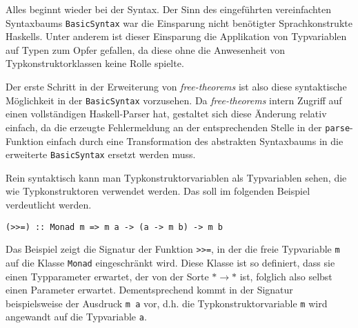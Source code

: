 Alles beginnt wieder bei der Syntax. Der Sinn des eingeführten vereinfachten Syntaxbaums \texttt{BasicSyntax} war
die Einsparung nicht benötigter Sprachkonstrukte Haskells. Unter anderem ist dieser Einsparung die Applikation
von Typvariablen auf Typen zum Opfer gefallen, da diese ohne die Anwesenheit von Typkonstruktorklassen keine Rolle
spielte.

Der erste Schritt in der Erweiterung von \textit{free-theorems} ist also diese syntaktische Möglichkeit in der \texttt{BasicSyntax}
vorzusehen. Da \textit{free-theorems} intern Zugriff auf einen vollständigen Haskell-Parser hat, gestaltet sich
diese Änderung relativ einfach, da die erzeugte Fehlermeldung an der entsprechenden Stelle in der \texttt{parse}-Funktion
einfach durch eine Transformation des abstrakten Syntaxbaums in die erweiterte \texttt{BasicSyntax} ersetzt werden muss.

Rein syntaktisch kann man Typkonstruktorvariablen als Typvariablen sehen, die wie Typkonstruktoren verwendet werden. Das
soll im folgenden Beispiel verdeutlicht werden.


\begin{verbatim}
(>>=) :: Monad m => m a -> (a -> m b) -> m b
\end{verbatim}

Das Beispiel zeigt die Signatur der Funktion \texttt{>>=}, in der die freie Typvariable \texttt{m} auf die Klasse \texttt{Monad}
eingeschränkt wird. Diese Klasse ist so definiert, dass sie einen Typparameter erwartet, der von der Sorte $* \rightarrow *$ ist,
folglich also selbst einen Parameter erwartet. Dementsprechend kommt in der Signatur beispielsweise der Ausdruck \texttt{m\ a} vor,
d.h. die Typkonstruktorvariable \texttt{m} wird angewandt auf die Typvariable \texttt{a}.

